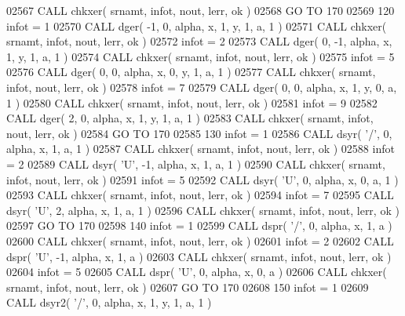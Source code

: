 \begin{DoxyCode}
02567       \textcolor{keyword}{CALL }chkxer( srnamt, infot, nout, lerr, ok )
02568       \textcolor{keywordflow}{GO TO} 170
02569   120 infot = 1
02570       \textcolor{keyword}{CALL }dger( -1, 0, alpha, x, 1, y, 1, a, 1 )
02571       \textcolor{keyword}{CALL }chkxer( srnamt, infot, nout, lerr, ok )
02572       infot = 2
02573       \textcolor{keyword}{CALL }dger( 0, -1, alpha, x, 1, y, 1, a, 1 )
02574       \textcolor{keyword}{CALL }chkxer( srnamt, infot, nout, lerr, ok )
02575       infot = 5
02576       \textcolor{keyword}{CALL }dger( 0, 0, alpha, x, 0, y, 1, a, 1 )
02577       \textcolor{keyword}{CALL }chkxer( srnamt, infot, nout, lerr, ok )
02578       infot = 7
02579       \textcolor{keyword}{CALL }dger( 0, 0, alpha, x, 1, y, 0, a, 1 )
02580       \textcolor{keyword}{CALL }chkxer( srnamt, infot, nout, lerr, ok )
02581       infot = 9
02582       \textcolor{keyword}{CALL }dger( 2, 0, alpha, x, 1, y, 1, a, 1 )
02583       \textcolor{keyword}{CALL }chkxer( srnamt, infot, nout, lerr, ok )
02584       \textcolor{keywordflow}{GO TO} 170
02585   130 infot = 1
02586       \textcolor{keyword}{CALL }dsyr( \textcolor{stringliteral}{'/'}, 0, alpha, x, 1, a, 1 )
02587       \textcolor{keyword}{CALL }chkxer( srnamt, infot, nout, lerr, ok )
02588       infot = 2
02589       \textcolor{keyword}{CALL }dsyr( \textcolor{stringliteral}{'U'}, -1, alpha, x, 1, a, 1 )
02590       \textcolor{keyword}{CALL }chkxer( srnamt, infot, nout, lerr, ok )
02591       infot = 5
02592       \textcolor{keyword}{CALL }dsyr( \textcolor{stringliteral}{'U'}, 0, alpha, x, 0, a, 1 )
02593       \textcolor{keyword}{CALL }chkxer( srnamt, infot, nout, lerr, ok )
02594       infot = 7
02595       \textcolor{keyword}{CALL }dsyr( \textcolor{stringliteral}{'U'}, 2, alpha, x, 1, a, 1 )
02596       \textcolor{keyword}{CALL }chkxer( srnamt, infot, nout, lerr, ok )
02597       \textcolor{keywordflow}{GO TO} 170
02598   140 infot = 1
02599       \textcolor{keyword}{CALL }dspr( \textcolor{stringliteral}{'/'}, 0, alpha, x, 1, a )
02600       \textcolor{keyword}{CALL }chkxer( srnamt, infot, nout, lerr, ok )
02601       infot = 2
02602       \textcolor{keyword}{CALL }dspr( \textcolor{stringliteral}{'U'}, -1, alpha, x, 1, a )
02603       \textcolor{keyword}{CALL }chkxer( srnamt, infot, nout, lerr, ok )
02604       infot = 5
02605       \textcolor{keyword}{CALL }dspr( \textcolor{stringliteral}{'U'}, 0, alpha, x, 0, a )
02606       \textcolor{keyword}{CALL }chkxer( srnamt, infot, nout, lerr, ok )
02607       \textcolor{keywordflow}{GO TO} 170
02608   150 infot = 1
02609       \textcolor{keyword}{CALL }dsyr2( \textcolor{stringliteral}{'/'}, 0, alpha, x, 1, y, 1, a, 1 )

\end{DoxyCode}
